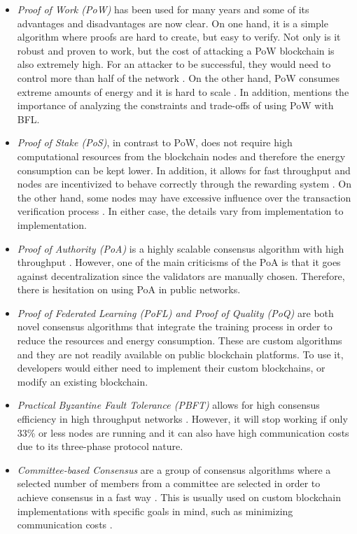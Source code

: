 \begin{itemize}
    \item \textit{Proof of Work (PoW)} has been used for many years and some of its advantages and disadvantages are now clear. On one hand, it is a simple algorithm where proofs are hard to create, but easy to verify. Not only is it robust and proven to work, but the cost of attacking a PoW blockchain is also extremely high. For an attacker to be successful, they would need to control more than half of the network \cite{li_blockchain_2021}. On the other hand, PoW consumes extreme amounts of energy and it is hard to scale \cite{edwood_2020, li_blockchain_2021, ccaf}. In addition, \cite{10.48550/arxiv.2112.07938} mentions the importance of analyzing the constraints and trade-offs of using PoW with BFL.

    \item \textit{Proof of Stake (PoS)}, in contrast to PoW, does not require high computational resources from the blockchain nodes and therefore the energy consumption can be kept lower. In addition, it allows for fast throughput and nodes are incentivized to behave correctly through the rewarding system \cite{li_blockchain_2021}. On the other hand, some nodes may have excessive influence over the transaction verification process \cite{li_blockchain_2021}. In either case, the details vary from implementation to implementation.
    
    \item \textit{Proof of Authority (PoA)} is a highly scalable consensus algorithm with high throughput \cite{binance_academy_2020}. However, one of the main criticisms of the PoA is that it goes against decentralization since the validators are manually chosen. Therefore, there is hesitation on using PoA in public networks.

    \item \textit{Proof of Federated Learning (PoFL) \cite{9347812, 10.48550/arxiv.2007.15145} and Proof of Quality (PoQ)} \cite{8843900} are both novel consensus algorithms that integrate the training process in order to reduce the resources and energy consumption. These are custom algorithms and they are not readily available on public blockchain platforms. To use it, developers would either need to implement their custom blockchains, or modify an existing blockchain.

    \item \textit{Practical Byzantine Fault Tolerance (PBFT)} allows for high consensus efficiency in high throughput networks \cite{li_blockchain_2021}. However, it will stop working if only 33\% or less nodes are running and it can also have high communication costs due to its three-phase protocol nature.

    \item \textit{Committee-based Consensus} are a group of consensus algorithms where a selected number of members from a committee are selected in order to achieve consensus in a fast way \cite{qu_blockchain-enabled_2022}. This is usually used on custom blockchain implementations with specific goals in mind, such as minimizing communication costs \cite{9293091}.
\end{itemize}

